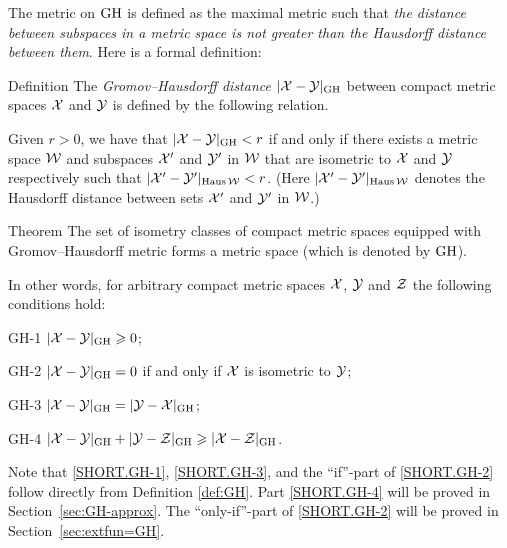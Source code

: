 The metric on $\operatorname{\rm GH}\nolimits$ is defined as the maximal metric such that \textit{the distance between subspaces in a metric space is not greater than the Hausdorff distance between them}.
Here is a formal definition:

\begin{thm}{Definition}\label{def:GH}
The \emph{Gromov--Hausdorff distance} $|\mathcal{X}-\mathcal{Y}|_{\operatorname{\rm GH}\nolimits}$ between compact metric spaces $\mathcal{X}$ and $\mathcal{Y}$
is defined by the following
relation.
 
Given  $r > 0$, we have that $|\mathcal{X}-\mathcal{Y}|_{\operatorname{\rm GH}\nolimits} < r$ if and only if there exists a metric
space $\mathcal{W}$ and subspaces $\mathcal{X}'$ and $\mathcal{Y}'$ in $\mathcal{W}$ that are isometric to $\mathcal{X}$ and $\mathcal{Y}$
respectively such that $|\mathcal{X}'-\mathcal{Y}'|_{\operatorname{\rm Haus}\nolimits\mathcal{W}} < r$. 
(Here $|\mathcal{X}'-\mathcal{Y}'|_{\operatorname{\rm Haus}\nolimits\mathcal{W}}$ denotes the Hausdorff distance between sets $\mathcal{X}'$ and $\mathcal{Y}'$ in $\mathcal{W}$.)
\end{thm}

\begin{thm}{Theorem}\label{thm:GH-is-a-metric}
The set of isometry classes of compact metric spaces equipped with Gromov--Hausdorff metric forms a metric space (which is denoted by $\operatorname{\rm GH}\nolimits$).

In other words, for arbitrary compact metric spaces $\mathcal{X}$, $\mathcal{Y}$ and $\mathcal{Z}$ the following conditions hold:

\begin{subthm}{GH-1} $|\mathcal{X}-\mathcal{Y}|_{\operatorname{\rm GH}\nolimits}\geqslant 0$;
\end{subthm}

\begin{subthm}{GH-2} $|\mathcal{X}-\mathcal{Y}|_{\operatorname{\rm GH}\nolimits}=0$ if and only if $\mathcal{X}$ is isometric to $\mathcal{Y}$;
\end{subthm}

\begin{subthm}{GH-3} $|\mathcal{X}-\mathcal{Y}|_{\operatorname{\rm GH}\nolimits}=|\mathcal{Y}-\mathcal{X}|_{\operatorname{\rm GH}\nolimits}$;
\end{subthm}

\begin{subthm}{GH-4} $|\mathcal{X}-\mathcal{Y}|_{\operatorname{\rm GH}\nolimits}+|\mathcal{Y}-\mathcal{Z}|_{\operatorname{\rm GH}\nolimits}\geqslant |\mathcal{X}-\mathcal{Z}|_{\operatorname{\rm GH}\nolimits}$.
\end{subthm}
\end{thm}


Note that \ref{SHORT.GH-1}, \ref{SHORT.GH-3},
and the ``if''-part of \ref{SHORT.GH-2} follow directly from Definition \ref{def:GH}.
Part \ref{SHORT.GH-4} will be proved in Section~\ref{sec:GH-approx}.
The ``only-if''-part of \ref{SHORT.GH-2} will be proved in Section~\ref{sec:extfun=GH}.

